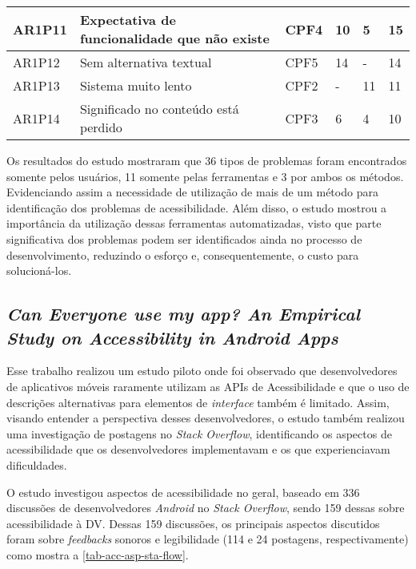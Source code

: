 \begin{table}[htb]
\begin{center}
\begin{tabular}{p{1.2cm}|p{8.7cm}|p{1.4cm}|p{0.6cm}|p{0.6cm}|p{0.7cm}}
      \hline
      AR1P11          & Expectativa de funcionalidade que não existe                            & CPF4               & 10           & 5            & 15             \\
      \hline
      AR1P12          & Sem alternativa textual                                                 & CPF5               & 14           & -            & 14             \\
      \hline
      AR1P13          & Sistema muito lento                                                     & CPF2               & -            & 11           & 11             \\
      \hline
      AR1P14          & Significado no conteúdo está perdido                                    & CPF3               & 6            & 4            & 10             \\
    \end{tabular}
  \end{center}
\end{table}

Os resultados do estudo mostraram que 36 tipos de problemas foram encontrados somente pelos usuários, 11 somente pelas ferramentas e 3 por ambos os métodos.
Evidenciando assim a necessidade de utilização de mais de um método para identificação dos problemas de acessibilidade.
Além disso, o estudo mostrou a importância da utilização dessas ferramentas automatizadas, visto que parte significativa dos problemas podem ser identificados ainda no processo de desenvolvimento, reduzindo o esforço e, consequentemente, o custo para solucioná-los.

\subsection{\emph{Can Everyone use my app? An Empirical Study on Accessibility in Android Apps}}

Esse trabalho realizou um estudo piloto onde foi observado que desenvolvedores de aplicativos móveis raramente utilizam as APIs de Acessibilidade e que o uso de descrições alternativas para elementos de \emph{interface} também é limitado.
Assim, visando entender a perspectiva desses desenvolvedores, o estudo também realizou uma investigação de postagens no \emph{Stack Overflow}, identificando os aspectos de acessibilidade que os desenvolvedores implementavam e os que experienciavam dificuldades.

O estudo investigou aspectos de acessibilidade no geral, baseado em 336 discussões de desenvolvedores \emph{Android} no \emph{Stack Overflow}, sendo 159 dessas sobre acessibilidade à DV\@.
Dessas 159 discussões, os principais aspectos discutidos foram sobre \emph{feedbacks} sonoros e legibilidade (114 e 24 postagens, respectivamente) como mostra a \autoref{tab-acc-asp-sta-flow}.

